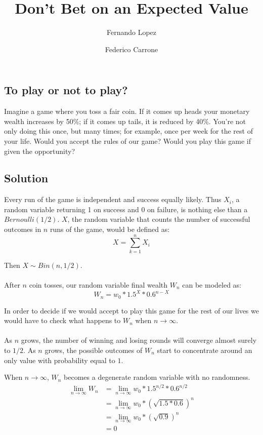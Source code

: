 \documentclass[12pt]{article}
\title{Don't Bet on an Expected Value}
\author{Fernando Lopez \and Federico Carrone}
\begin{document}
\maketitle
{}

\subsection{To play or not to play?}

Imagine a game where you toss a fair coin. If it comes up heads your monetary wealth increases by 50\%; if it comes up tails, it is reduced by 40\%. You’re not only doing this once, but many times; for example, once per week for the rest of your life. Would you accept the rules of our game? Would you play this game if given the opportunity?

\subsection{Solution}
Every run of the game is independent and success equally likely. Thus $X_i$, a random variable returning 1 on success and 0 on failure, is nothing else than a $Bernoulli(1/2)$. $X$, the random variable that counts the number of successful outcomes in $n$ runs of the game, would be defined as:
\begin{equation*}
 X = \sum\limits_{k=1}^{n} X_i
\end{equation*}

Then $X \sim Bin(n, 1/2)$.
\\\\
After $n$ coin tosses, our random variable final wealth $W_n$ can be modeled as:
\begin{equation*}
    W_n = w_0 * 1.5^X * 0.6^{n-X}
\end{equation*}

In order to decide if we would accept to play this game for the rest of our lives we would have to check what happens to $W_n$ when $n \rightarrow \infty$.
\\\\
As $n$ grows, the number of winning and losing rounds will converge almost surely to $1/2$. As $n$ grows, the possible outcomes of $W_n$ start to concentrate around an only value with probability equal to $1$.

When $n \rightarrow \infty$, $W_n$ becomes a degenerate random variable with no randomness.
\begin{equation*}
  \begin{split}
    \lim_{n\to\infty} W_n &= \lim_{n\to\infty}w_0 * 1.5^{n/2} * 0.6^{n/2} \\
    &= \lim_{n\to\infty}w_0 * (\sqrt{1.5*0.6})^{n}\\
    &= \lim_{n\to\infty}w_0 * (\sqrt{0.9}) ^{n}\\
    &= 0
  \end{split}
\end{equation*}
\end{document}
